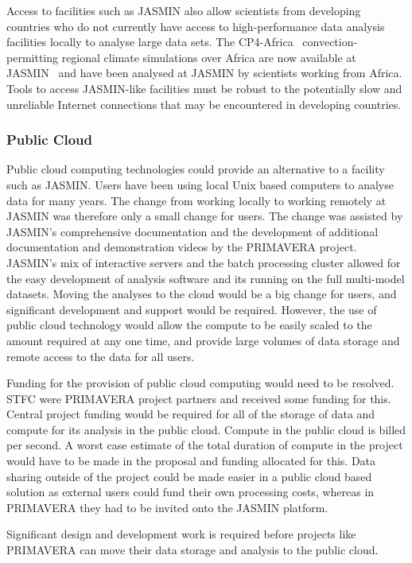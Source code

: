\documentclass[gmd, manuscript]{copernicus}
\begin{document}
Access to facilities such as JASMIN also allow scientists from developing countries who do not currently have access to high-performance data analysis facilities locally to analyse large data sets. The CP4-Africa~\citep{Stratton2018} convection-permitting regional climate simulations over Africa are now available at JASMIN~\citep{Senior2019} and have been analysed at JASMIN by scientists working from Africa. Tools to access JASMIN-like facilities must be robust to the potentially slow and unreliable Internet connections that may be encountered in developing countries.


\subsubsection{Public Cloud}
Public cloud computing technologies could provide an alternative to a facility such as JASMIN. Users have been using local Unix based computers to analyse data for many years. The change from working locally to working remotely at JASMIN was therefore only a small change for users. The change was assisted by JASMIN's comprehensive documentation and the development of additional documentation and demonstration videos by the PRIMAVERA project. JASMIN's mix of interactive servers and the batch processing cluster allowed for the easy development of analysis software and its running on the full multi-model datasets. Moving the analyses to the cloud would be a big change for users, and significant development and support would be required. However, the use of public cloud technology would allow the compute to be easily scaled to the amount required at any one time, and provide large volumes of data storage and remote access to the data for all users.

Funding for the provision of public cloud computing would need to be resolved. STFC were PRIMAVERA project partners and received some funding for this. Central project funding would be required for all of the storage of data and compute for its analysis in the public cloud. Compute in the public cloud is billed per second. A worst case estimate of the total duration of compute in the project would have to be made in the proposal and funding allocated for this. Data sharing outside of the project could be made easier in a public cloud based solution as external users could fund their own processing costs, whereas in PRIMAVERA they had to be invited onto the JASMIN platform.

Significant design and development work is required before projects like PRIMAVERA can move their data storage and analysis to the public cloud.
\end{document}
